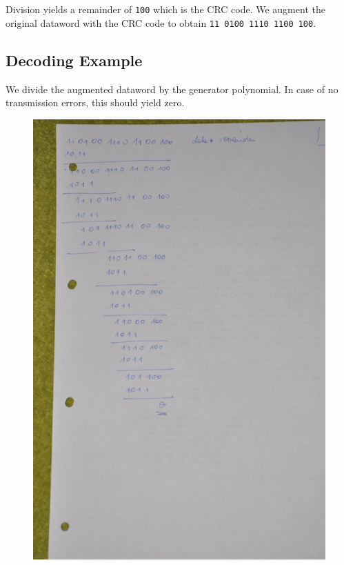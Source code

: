 Division yields a remainder of \texttt{100} which is the CRC code. We
augment the original dataword with the CRC code to obtain
\texttt{11\ 0100\ 1110\ 1100\ 100}.

\subsection{Decoding Example}\label{decoding-example}

We divide the augmented dataword by the generator polynomial. In case of
no transmission errors, this should yield zero.

\begin{figure}[hbt!]
\centering
\includegraphics[scale=1.2]{images/DSC_0856_small.JPG}
\end{figure}

